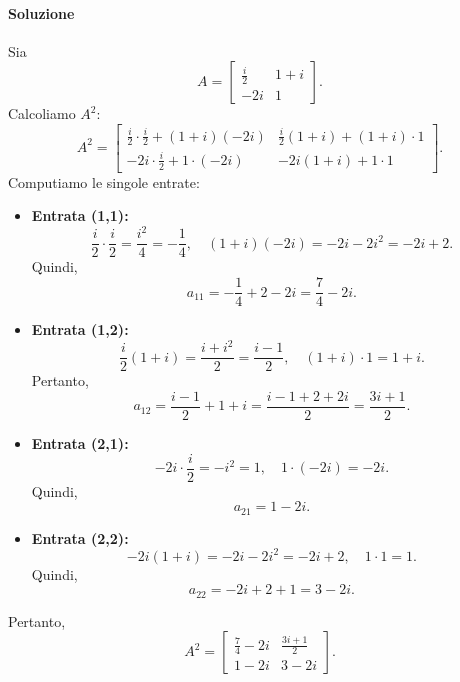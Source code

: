 \documentclass{article}
\theoremstyle{plain}
\theoremstyle{definition}
\theoremstyle{remark}
\begin{document}
\paragraph{Soluzione}
Sia 
\[
A=\begin{bmatrix}
\frac{i}{2} & 1+i\\[2mm]
-2i & 1
\end{bmatrix}.
\]
Calcoliamo \(A^2\):
\[
A^2 = \begin{bmatrix}
\frac{i}{2}\cdot\frac{i}{2}+(1+i)(-2i) & \frac{i}{2}(1+i)+(1+i)\cdot1\\[2mm]
-2i\cdot\frac{i}{2}+1\cdot(-2i) & -2i(1+i)+1\cdot1
\end{bmatrix}.
\]
Computiamo le singole entrate:
\begin{itemize}
    \item \textbf{Entrata (1,1):}
    \[
    \frac{i}{2}\cdot\frac{i}{2} = \frac{i^2}{4} = -\frac{1}{4},\quad
    (1+i)(-2i) = -2i-2i^2 = -2i+2.
    \]
    Quindi,
    \[
    a_{11} = -\frac{1}{4}+2-2i=\frac{7}{4}-2i.
    \]
    
    \item \textbf{Entrata (1,2):}
    \[
    \frac{i}{2}(1+i)=\frac{i+i^2}{2}=\frac{i-1}{2},\quad
    (1+i)\cdot1=1+i.
    \]
    Pertanto,
    \[
    a_{12} = \frac{i-1}{2}+1+i = \frac{i-1+2+2i}{2}=\frac{3i+1}{2}.
    \]
    
    \item \textbf{Entrata (2,1):}
    \[
    -2i\cdot\frac{i}{2} = -i^2=1,\quad
    1\cdot(-2i)=-2i.
    \]
    Quindi,
    \[
    a_{21}=1-2i.
    \]
    
    \item \textbf{Entrata (2,2):}
    \[
    -2i(1+i) = -2i-2i^2=-2i+2,\quad
    1\cdot 1 =1.
    \]
    Quindi,
    \[
    a_{22}= -2i+2+1=3-2i.
    \]
\end{itemize}
Pertanto,
\[
A^2=\begin{bmatrix}
\frac{7}{4}-2i & \frac{3i+1}{2}\\[2mm]
1-2i & 3-2i
\end{bmatrix}.
\]
\end{document}
